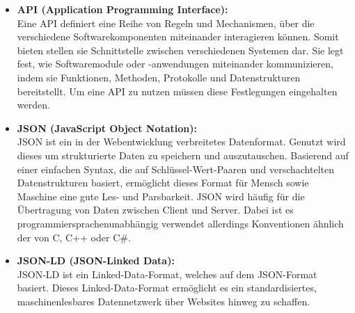 \begin{itemize}
    \item \textbf{API (Application Programming Interface):} \\
    Eine API definiert eine Reihe von Regeln und Mechanismen, über die verschiedene Softwarekomponenten miteinander interagieren können.
    Somit bieten stellen sie Schnittstelle zwischen verschiedenen Systemen dar.
    Sie legt fest, wie Softwaremodule oder -anwendungen miteinander kommunizieren, indem sie Funktionen, Methoden, Protokolle und Datenstrukturen bereitstellt.
    Um eine API zu nutzen müssen diese Festlegungen eingehalten werden.
    
    
    \item \textbf{JSON (JavaScript Object Notation):} \\
    JSON ist ein in der Webentwicklung verbreitetes Datenformat.
    Genutzt wird dieses um strukturierte Daten zu speichern und auszutauschen.
    Basierend auf einer einfachen Syntax, die auf Schlüssel-Wert-Paaren und verschachtelten Datenstrukturen basiert, ermöglicht dieses Format für Mensch sowie Maschine eine gute Les- und Parsbarkeit.
    JSON wird häufig für die Übertragung von Daten zwischen Client und Server.
    Dabei ist es programmiersprachenunabhängig verwendet allerdings Konventionen ähnlich der von C, C++ oder C\#.

    \item \textbf{JSON-LD (JSON-Linked Data):} \\
    JSON-LD ist ein Linked-Data-Format, welches auf dem JSON-Format basiert.
    Dieses Linked-Data-Format ermöglicht es ein standardisiertes, maschinenlesbares Datennetzwerk über Websites hinweg zu schaffen.
\end{itemize}